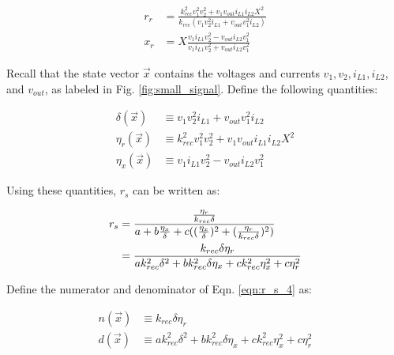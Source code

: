 \documentclass[conference, twocolumn, letterpaper]{IEEEtran}
\begin{document}
\vspace{-0.2cm}
\begin{equation}
\label{eqn:r_s_2}
\begin{split}
r_r &= \frac{k_{rec}^2 v_1^2 v_2^2 + v_1v_{out}i_{L1}i_{L2}X^2}{k_{rec}(v_1v_2^2i_{L1} + v_{out}v_1^2i_{L2})} \\
x_r &= X\frac{v_1 i_{L1}v_2^2 - v_{out} i_{L2}v_1^2}{v_1 i_{L1}v_2^2 + v_{out} i_{L2}v_1^2}
\end{split}
\end{equation}

Recall that the state vector $\vec{x}$ contains the voltages and currents $v_1, v_2, i_{L1}, i_{L2}$, and $v_{out}$, as labeled in Fig. \ref{fig:small_signal}. Define the following quantities:

\vspace{-0.2cm}
\begin{equation}
\label{eqn:delta_eta}
\begin{split}
\delta(\vec{x}) &\equiv v_1v_2^2i_{L1} + v_{out}v_1^2i_{L2} \\
\eta_r(\vec{x}) &\equiv k_{rec}^2v_1^2v_2^2 + v_1v_{out}i_{L1}i_{L2}X^2 \\
\eta_x(\vec{x}) &\equiv v_1i_{L1}v_2^2 - v_{out}i_{L2}v_1^2
\end{split}
\end{equation}

Using these quantities, $r_s$ can be written as:

\begin{subequations}
\vspace{-0.2cm}
\label{eqn:r_s_3}
\begin{align}
r_s &= \frac{\frac{\eta_r}{k_{rec}\delta}}{a + b\frac{\eta_x}{\delta} + c((\frac{\eta_x}{\delta})^2 + (\frac{\eta_r}{k_{rec}\delta})^2)} \\
&= \frac{k_{rec}\delta\eta_r}{ak_{rec}^2\delta^2 + bk_{rec}^2\delta\eta_x + ck_{rec}^2\eta_x^2+c\eta_r^2} \label{eqn:r_s_4}
\end{align}
\end{subequations}

Define the numerator and denominator of Eqn. \ref{eqn:r_s_4} as:

\vspace{-0.2cm}
\begin{equation}
\label{eqn:r_s_5}
\begin{split}
n(\vec{x}) &\equiv k_{rec}\delta\eta_r \\
d(\vec{x}) &\equiv ak_{rec}^2\delta^2 + bk_{rec}^2\delta\eta_x + ck_{rec}^2\eta_x^2 + c\eta_r^2
\end{split}
\end{equation}
\end{document}
